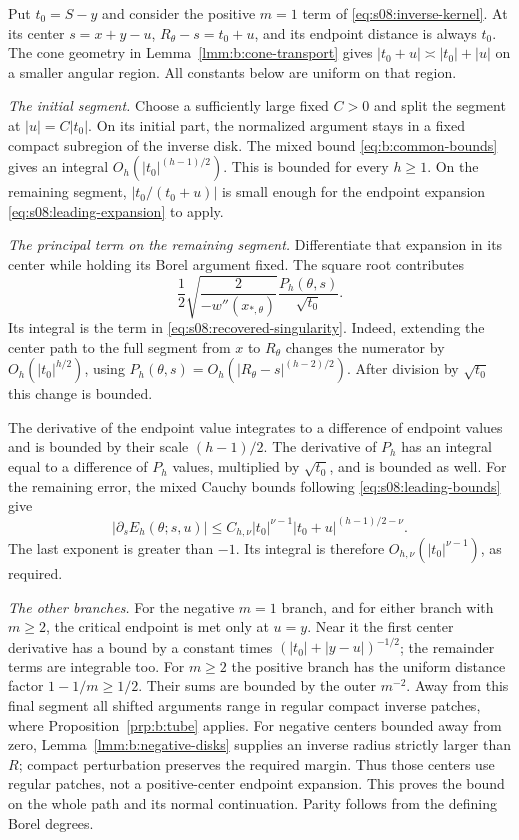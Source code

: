 \begin{prf}
Put $t_0=S-y$ and consider the positive $m=1$ term of
\eqref{eq:s08:inverse-kernel}. At its center $s=x+y-u$,
$R_\theta-s=t_0+u$, and its endpoint distance is always $t_0$.
The cone geometry in Lemma~\ref{lmm:b:cone-transport} gives
$|t_0+u|\asymp |t_0|+|u|$ on a smaller angular region.
All constants below are uniform on that region.

\smallskip\noindent
\emph{The initial segment.}
Choose a sufficiently large fixed $C>0$ and split the segment at
$|u|=C|t_0|$. On its initial part, the normalized argument stays
in a fixed compact subregion of the inverse disk. The mixed bound
\eqref{eq:b:common-bounds} gives an integral
$O_h(|t_0|^{(h-1)/2})$. This is bounded for every $h\geq1$.
On the remaining segment, $|t_0/(t_0+u)|$ is small enough for
the endpoint expansion \eqref{eq:s08:leading-expansion} to apply.

\smallskip\noindent
\emph{The principal term on the remaining segment.}
Differentiate that expansion in its center while holding its Borel
argument fixed. The square root contributes
\[
 \frac12\sqrt{\frac{2}{-w''(x_{*,\theta})}}
               \frac{P_h(\theta,s)}{\sqrt{t_0}}.
\]
Its integral is the term in \eqref{eq:s08:recovered-singularity}.
Indeed, extending the center path to the full segment from $x$ to
$R_\theta$ changes the numerator by
$O_h(|t_0|^{h/2})$, using
$P_h(\theta,s)=O_h(|R_\theta-s|^{(h-2)/2})$.
After division by $\sqrt{t_0}$ this change is bounded.

The derivative of the endpoint value integrates to a difference
of endpoint values and is bounded by their scale $(h-1)/2$.
The derivative of $P_h$ has an integral equal to a difference of
$P_h$ values, multiplied by $\sqrt{t_0}$, and is bounded as well.
For the remaining error, the mixed Cauchy bounds following
\eqref{eq:s08:leading-bounds} give
\[
 |\partial_sE_h(\theta;s,u)|
 \leq C_{h,\nu}|t_0|^{\nu-1}
                    |t_0+u|^{(h-1)/2-\nu}.
\]
The last exponent is greater than $-1$. Its integral is therefore
$O_{h,\nu}(|t_0|^{\nu-1})$, as required.

\smallskip\noindent
\emph{The other branches.}
For the negative $m=1$ branch, and for either branch with $m\geq2$,
the critical endpoint is met only at $u=y$. Near it the first
center derivative has a bound by a constant times
$(|t_0|+|y-u|)^{-1/2}$; the remainder terms are integrable too.
For $m\geq2$ the positive branch has the uniform distance factor
$1-1/m\geq1/2$. Their sums are bounded by the outer $m^{-2}$.
Away from this final segment all shifted arguments range in
regular compact inverse patches, where
Proposition~\ref{prp:b:tube} applies. For negative centers bounded
away from zero, Lemma~\ref{lmm:b:negative-disks} supplies an inverse
radius strictly larger than $R$; compact perturbation preserves the
required margin. Thus those centers use regular patches, not a
positive-center endpoint expansion. This proves the bound on the whole path and its normal
continuation. Parity follows from the defining Borel degrees.
\end{prf}

